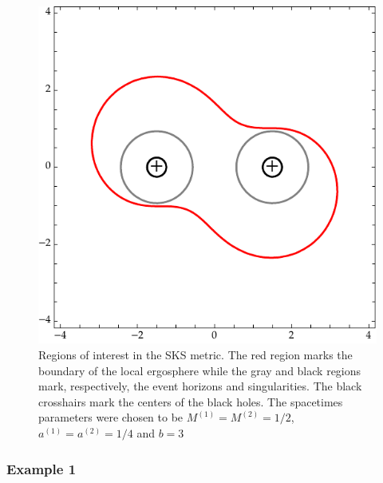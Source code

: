 \begin{figure}[!ht]
  \centering
  \includegraphics[scale = 1.0]{img/penrose_binaries/sks_regions.pdf}
  \caption{Regions of interest in the SKS metric. The red region marks the boundary of the local ergosphere while the gray and black regions mark, respectively, the event horizons and singularities. The black crosshairs mark the centers of the black holes. The spacetimes parameters were chosen to be $M^{(1)} = M^{(2)} = 1/2$, $a^{(1)} = a^{(2)} = 1/4$ and $b = 3$}
  \label{fig:sks_ergo_plot}
\end{figure}

\subsubsection{Example 1}
\label{ch:sks_example_1}

